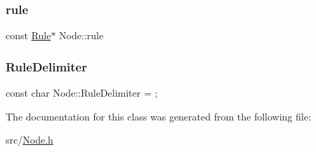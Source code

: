 \mbox{\label{class_node_a02f5c9463cceb270ad5730760f19c722}} 
\subsubsection{\texorpdfstring{rule}{rule}}
{\footnotesize\ttfamily const \hyperlink{class_rule}{Rule}$\ast$ Node\+::rule}

\mbox{\label{class_node_ab58932e82964fb75ba806870c4069dc2}} 
\subsubsection{\texorpdfstring{Rule\+Delimiter}{RuleDelimiter}}
{\footnotesize\ttfamily const char Node\+::\+Rule\+Delimiter = \textquotesingle{};\textquotesingle{}\hspace{0.3cm}{\ttfamily [static]}}



The documentation for this class was generated from the following file\+:\begin{DoxyCompactItemize}
\item 
src/\hyperlink{_node_8h}{Node.\+h}\end{DoxyCompactItemize}
